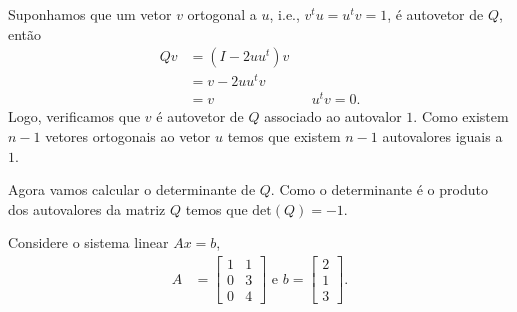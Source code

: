 \begin{questions}
\begin{solution}
       Suponhamos que um vetor $v$ ortogonal a $u$, i.e., $v^t u = u^t v = 1$, \'{e} autovetor de $Q$, ent\~{a}o
       \begin{align*}
           Q v &= \left( I - 2 u u^t \right) v \\
           &= v - 2 u u^t v \\
           &= v && u^t v = 0.
       \end{align*}
       Logo, verificamos que $v$ \'{e} autovetor de $Q$ associado ao autovalor $1$. Como existem $n - 1$ vetores ortogonais ao vetor $u$ temos que existem $n - 1$ autovalores iguais a $1$.

       Agora vamos calcular o determinante de $Q$. Como o determinante \'{e} o produto dos autovalores da matriz $Q$ temos que $\text{det}(Q) = -1$.
    \end{solution}

    \question Considere o sistema linear $A x = b$,
    \begin{align*}
        A &= \begin{bmatrix}
            1 & 1 \\
            0 & 3 \\
            0 & 4
        \end{bmatrix} \text{ e } b = \begin{bmatrix}
            2 \\
            1 \\
            3
        \end{bmatrix}.
    \end{align*}
    \begin{parts}

\end{parts}
\end{questions}
